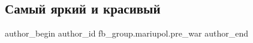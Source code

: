  
 
 
 
 

\subsection{Самый яркий и красивый}
\label{sec:24_02_2023.fb.fb_group.mariupol.pre_war.1.samii_yarkii_i_krasi}

\ifcmt
 author_begin
   author_id fb_group.mariupol.pre_war
 author_end
\fi
